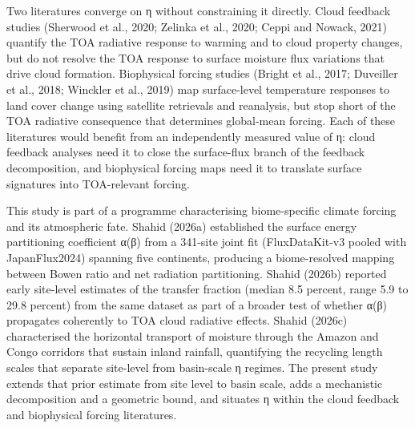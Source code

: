 Two literatures converge on η without constraining it directly. Cloud feedback studies (Sherwood et al., 2020; Zelinka et al., 2020; Ceppi and Nowack, 2021) quantify the TOA radiative response to warming and to cloud property changes, but do not resolve the TOA response to surface moisture flux variations that drive cloud formation. Biophysical forcing studies (Bright et al., 2017; Duveiller et al., 2018; Winckler et al., 2019) map surface-level temperature responses to land cover change using satellite retrievals and reanalysis, but stop short of the TOA radiative consequence that determines global-mean forcing. Each of these literatures would benefit from an independently measured value of η: cloud feedback analyses need it to close the surface-flux branch of the feedback decomposition, and biophysical forcing maps need it to translate surface signatures into TOA-relevant forcing.

This study is part of a programme characterising biome-specific climate forcing and its atmospheric fate. Shahid (2026a) established the surface energy partitioning coefficient α(β) from a 341-site joint fit (FluxDataKit-v3 pooled with JapanFlux2024) spanning five continents, producing a biome-resolved mapping between Bowen ratio and net radiation partitioning. Shahid (2026b) reported early site-level estimates of the transfer fraction (median 8.5 percent, range 5.9 to 29.8 percent) from the same dataset as part of a broader test of whether α(β) propagates coherently to TOA cloud radiative effects. Shahid (2026c) characterised the horizontal transport of moisture through the Amazon and Congo corridors that sustain inland rainfall, quantifying the recycling length scales that separate site-level from basin-scale η regimes. The present study extends that prior estimate from site level to basin scale, adds a mechanistic decomposition and a geometric bound, and situates η within the cloud feedback and biophysical forcing literatures.

